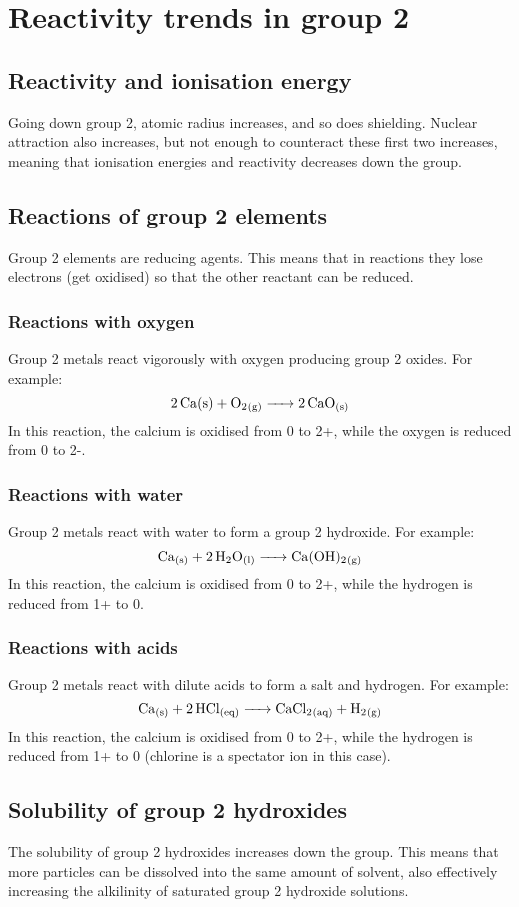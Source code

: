 \section{Reactivity trends in group 2}
\subsection{Reactivity and ionisation energy}
Going down group 2, atomic radius increases, and so does shielding. Nuclear attraction also increases, but not enough to counteract these first two increases, meaning that ionisation energies and reactivity decreases down the group.

\subsection{Reactions of group 2 elements}
Group 2 elements are reducing agents. This means that in reactions they lose electrons (get oxidised) so that the other reactant can be reduced.

\subsubsection{Reactions with oxygen}
Group 2 metals react vigorously with oxygen producing group 2 oxides. For example:
\begin{equation}
	\ce{2Ca{(s)} + O2_{(g)} -> 2CaO_{(s)}}
\end{equation}
In this reaction, the calcium is oxidised from 0 to 2+, while the oxygen is reduced from 0 to 2-.

\subsubsection{Reactions with water}
Group 2 metals react with water to form a group 2 hydroxide. For example:
\begin{equation}
	\ce{Ca_{(s)} + 2H2O_{(l)} -> Ca(OH)2_{(g)}}
\end{equation}
In this reaction, the calcium is oxidised from 0 to 2+, while the hydrogen is reduced from 1+ to 0.

\subsubsection{Reactions with acids}
Group 2 metals react with dilute acids to form a salt and hydrogen. For example:
\begin{equation}
	\ce{Ca_{(s)} + 2HCl_{(eq)} -> CaCl2_{(aq)} + H2_{(g)}}
\end{equation}
In this reaction, the calcium is oxidised from 0 to 2+, while the hydrogen is reduced from 1+ to 0 (chlorine is a spectator ion in this case).

\subsection{Solubility of group 2 hydroxides}
The solubility of group 2 hydroxides increases down the group. This means that more particles can be dissolved into the same amount of solvent, also effectively increasing the alkilinity of saturated group 2 hydroxide solutions.
